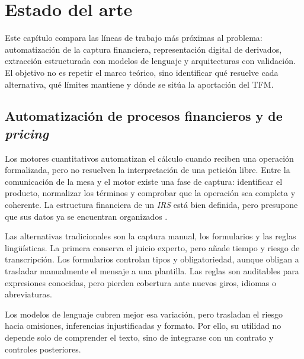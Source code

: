 \chapter{Estado del arte}
\label{cap:estado_arte}

Este capítulo compara las líneas de trabajo más próximas al problema: automatización de la captura financiera, representación digital de derivados, extracción estructurada con modelos de lenguaje y arquitecturas con validación. El objetivo no es repetir el marco teórico, sino identificar qué resuelve cada alternativa, qué límites mantiene y dónde se sitúa la aportación del TFM.

\section{Automatización de procesos financieros y de \textit{pricing}}
\label{sec:automatizacion_pricing}

Los motores cuantitativos automatizan el cálculo cuando reciben una operación formalizada, pero no resuelven la interpretación de una petición libre. Entre la comunicación de la mesa y el motor existe una fase de captura: identificar el producto, normalizar los términos y comprobar que la operación sea completa y coherente. La estructura financiera de un \textit{IRS} está bien definida, pero presupone que sus datos ya se encuentran organizados \citep[Definición~2.19, p.~59]{ausin2025quantitative}.

Las alternativas tradicionales son la captura manual, los formularios y las reglas lingüísticas. La primera conserva el juicio experto, pero añade tiempo y riesgo de transcripción. Los formularios controlan tipos y obligatoriedad, aunque obligan a trasladar manualmente el mensaje a una plantilla. Las reglas son auditables para expresiones conocidas, pero pierden cobertura ante nuevos giros, idiomas o abreviaturas.

Los modelos de lenguaje cubren mejor esa variación, pero trasladan el riesgo hacia omisiones, inferencias injustificadas y formato. Por ello, su utilidad no depende solo de comprender el texto, sino de integrarse con un contrato y controles posteriores.

